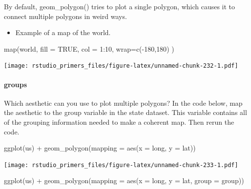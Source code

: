 \documentclass[
]{article}
\newenvironment{Shaded}{\begin{snugshade}}{\end{snugshade}}
\newcommand{\AttributeTok}[1]{\textcolor[rgb]{0.77,0.63,0.00}{#1}}
\newcommand{\ConstantTok}[1]{\textcolor[rgb]{0.00,0.00,0.00}{#1}}
\newcommand{\DecValTok}[1]{\textcolor[rgb]{0.00,0.00,0.81}{#1}}
\newcommand{\FunctionTok}[1]{\textcolor[rgb]{0.00,0.00,0.00}{#1}}
\newcommand{\NormalTok}[1]{#1}
\newcommand{\SpecialCharTok}[1]{\textcolor[rgb]{0.00,0.00,0.00}{#1}}
\newcommand{\StringTok}[1]{\textcolor[rgb]{0.31,0.60,0.02}{#1}}
\providecommand{\tightlist}{%
  \setlength{\itemsep}{0pt}\setlength{\parskip}{0pt}}
\begin{document}
By default, geom\_polygon() tries to plot a single polygon, which causes
it to connect multiple polygons in weird ways.

\begin{itemize}
\tightlist
\item
  Example of a map of the world.
\end{itemize}

\begin{Shaded}
\begin{Highlighting}[]
\FunctionTok{map}\NormalTok{(}\StringTok{\textquotesingle{}world\textquotesingle{}}\NormalTok{, }\AttributeTok{fill =} \ConstantTok{TRUE}\NormalTok{, }\AttributeTok{col =} \DecValTok{1}\SpecialCharTok{:}\DecValTok{10}\NormalTok{, }\AttributeTok{wrap=}\FunctionTok{c}\NormalTok{(}\SpecialCharTok{{-}}\DecValTok{180}\NormalTok{,}\DecValTok{180}\NormalTok{) )}
\end{Highlighting}
\end{Shaded}

\texttt{[image: rstudio\_primers\_files/figure-latex/unnamed-chunk-232-1.pdf]}

\hypertarget{groups}{%
\paragraph{groups}\label{groups}}

Which aesthetic can you use to plot multiple polygons? In the code
below, map the aesthetic to the group variable in the state dataset.
This variable contains all of the grouping information needed to make a
coherent map. Then rerun the code.

\begin{Shaded}
\begin{Highlighting}[]
\FunctionTok{ggplot}\NormalTok{(us) }\SpecialCharTok{+}
  \FunctionTok{geom\_polygon}\NormalTok{(}\AttributeTok{mapping =} \FunctionTok{aes}\NormalTok{(}\AttributeTok{x =}\NormalTok{ long, }\AttributeTok{y =}\NormalTok{ lat))}
\end{Highlighting}
\end{Shaded}

\texttt{[image: rstudio\_primers\_files/figure-latex/unnamed-chunk-233-1.pdf]}

\begin{Shaded}
\begin{Highlighting}[]
\FunctionTok{ggplot}\NormalTok{(us) }\SpecialCharTok{+}
  \FunctionTok{geom\_polygon}\NormalTok{(}\AttributeTok{mapping =} \FunctionTok{aes}\NormalTok{(}\AttributeTok{x =}\NormalTok{ long, }\AttributeTok{y =}\NormalTok{ lat, }\AttributeTok{group =}\NormalTok{ group))}
\end{Highlighting}
\end{Shaded}
\end{document}
